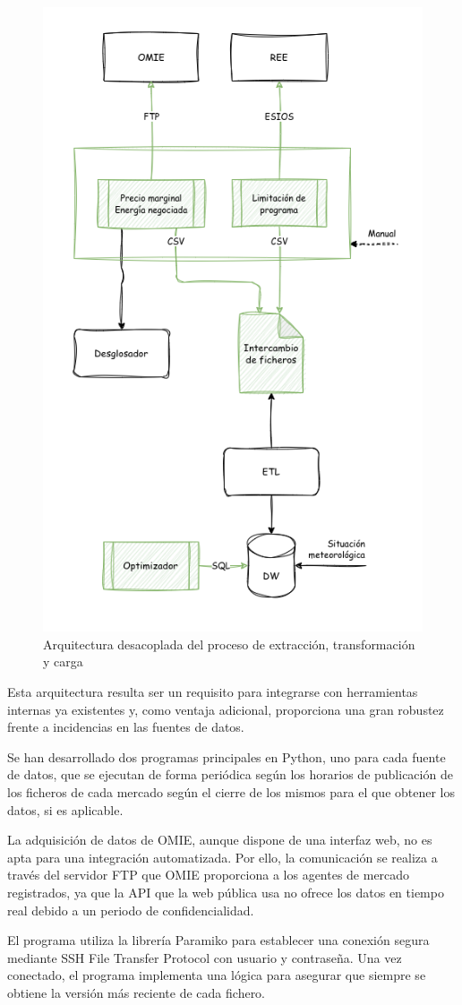 \begin{figure}
  \centering
  \includegraphics[width=0.5\linewidth]{figures/arquitectura-mercado.png}
  \caption{Arquitectura desacoplada del proceso de extracción, transformación y carga}
  \label{fig:arquitectura-mercado}
\end{figure}

Esta arquitectura resulta ser un requisito para integrarse con herramientas internas ya existentes y, como ventaja adicional, proporciona una gran robustez frente a incidencias en las fuentes de datos.

Se han desarrollado dos programas principales en Python, uno para cada fuente de datos, que se ejecutan de forma periódica según los horarios de publicación de los ficheros de cada mercado según el cierre de los mismos para el que obtener los datos, si es aplicable.

La adquisición de datos de OMIE, aunque dispone de una interfaz web, no es apta para una integración automatizada. Por ello, la comunicación se realiza a través del servidor FTP que OMIE proporciona a los agentes de mercado registrados, ya que la API que la web pública usa no ofrece los datos en tiempo real debido a un periodo de confidencialidad.

El programa utiliza la librería Paramiko para establecer una conexión segura mediante SSH File Transfer Protocol con usuario y contraseña. Una vez conectado, el programa implementa una lógica para asegurar que siempre se obtiene la versión más reciente de cada fichero.

